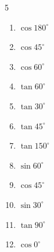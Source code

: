 \begin{multicols}{5}
\begin{enumerate}
        \phantom{$\displaystyle なし$}

  \item $\displaystyle \cos{180^\circ}$

        \phantom{$\displaystyle =-1$}

  \item $\displaystyle \cos{45^\circ}$


\columnbreak %

  \item $\displaystyle \cos{60^\circ}$


  \item $\displaystyle \tan{60^\circ}$


  \item $\displaystyle \tan{30^\circ}$


  \item $\displaystyle \tan{45^\circ}$

        \phantom{$\displaystyle =1$}

  \item $\displaystyle \tan{150^\circ}$


  \item $\displaystyle \sin{60^\circ}$


  \item $\displaystyle \cos{45^\circ}$


  \item $\displaystyle \sin{30^\circ}$


  \item $\displaystyle \tan{90^\circ}$

        \phantom{$\displaystyle なし$}

  \item $\displaystyle \cos{0^\circ}$

        \phantom{$\displaystyle =1$}


\end{enumerate}
\end{multicols}
